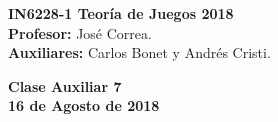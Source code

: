 \documentclass[11pt, spanish]{article}
\theoremstyle{plain}
\begin{document}

\begin{flushleft}
  \textbf{IN6228-1 Teoría de Juegos 2018}
  \\\textbf{Profesor:} José Correa.
  \\\textbf{Auxiliares:} Carlos Bonet y Andrés Cristi.
\end{flushleft}


\begin{center}
  \large{\textbf{Clase Auxiliar 7\\ 16 de Agosto de 2018}}
\end{center}

\end{document}
